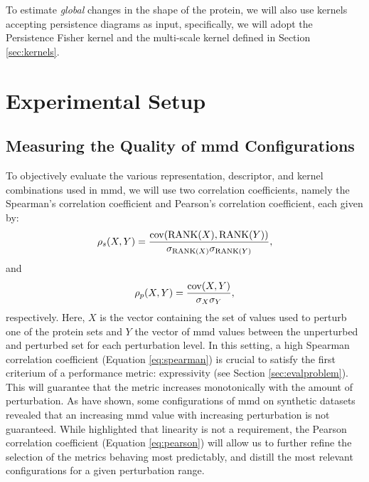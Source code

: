 To estimate \emph{global} changes in the shape of the protein, we will also use
kernels accepting persistence diagrams as input, specifically, we will adopt the
Persistence Fisher kernel \citep{le2018persistence} and the multi-scale kernel
\citep{reininghaus2015stable} defined in Section \ref{sec:kernels}.


\section{Experimental Setup}

\subsection{Measuring the Quality of \acrshort{mmd} Configurations}

To objectively evaluate the various representation, descriptor, and kernel
combinations used in \acrshort{mmd}, we will use two correlation coefficients, namely the
Spearman's correlation coefficient and Pearson's correlation coefficient, each
given by:
\begin{equation}
  \label{eq:spearman} \rho_s(X,Y) = {\mathrm{cov}(\mathrm{RANK}(X), \mathrm{RANK}(Y)) \over
\sigma_{\mathrm{RANK}(X)}\sigma_{\mathrm{RANK}(Y)}},
\end{equation} and
\begin{equation}
  \label{eq:pearson} \rho_p(X,Y) = {\mathrm{cov}(X, Y)\over \sigma_X\sigma_Y},
\end{equation}
respectively. Here, $X$ is the vector containing the set of values used to
perturb one of the protein sets and $Y$ the vector of \acrshort{mmd} values
between the unperturbed and perturbed set for each perturbation level. In this
setting, a high Spearman correlation coefficient (Equation \ref{eq:spearman}) is
crucial to satisfy the first criterium of a performance metric: expressivity
(see Section \ref{sec:evalproblem}). This will guarantee that the metric
increases monotonically with the amount of perturbation. As
\cite{obray2022evaluation} have shown, some configurations of \acrshort{mmd} on
synthetic datasets revealed that an increasing \acrshort{mmd} value with
increasing perturbation is not guaranteed. While \cite{thompson2022evaluation}
highlighted that linearity is not a requirement, the Pearson correlation
coefficient (Equation \ref{eq:pearson}) will allow us to further refine the
selection of the metrics behaving most predictably, and distill the most
relevant configurations for a given perturbation range.


